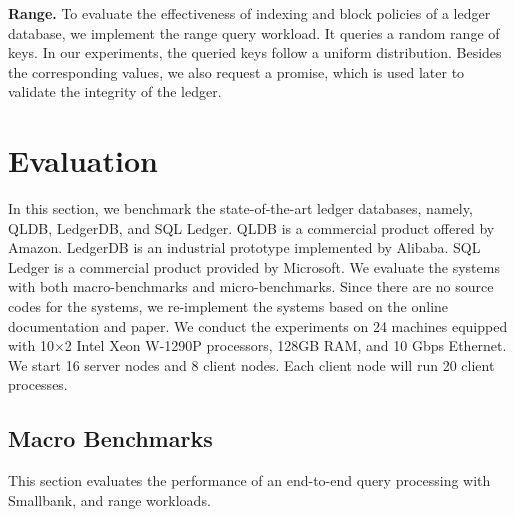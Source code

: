 \documentclass[11pt,dvipdfm]{article}
\begin{document}
\textbf{Range.}
To evaluate the effectiveness of indexing and block policies of a ledger database, we implement the range query workload. It queries a random range of keys. In our experiments, the queried keys follow a uniform distribution.  Besides the corresponding values, we also request a promise, which is used later to validate the integrity of the ledger.


\section{Evaluation}
\label{sec:exp}

In this section, we benchmark the state-of-the-art ledger databases, namely, QLDB, LedgerDB, and SQL Ledger. QLDB is a commercial product offered by Amazon. LedgerDB is an industrial prototype implemented by Alibaba. SQL Ledger is a commercial product provided by Microsoft.
We evaluate the systems with both macro-benchmarks and micro-benchmarks. Since there are no source codes for the systems, we re-implement the systems based on the online documentation and paper. We conduct the experiments on 24 machines equipped with 10$\times$2 Intel Xeon W-1290P processors, 128GB RAM, and 10 Gbps Ethernet. We start 16 server nodes and 8 client nodes. Each client node will run 20 client processes.

\subsection{Macro Benchmarks}

This section evaluates the performance of an end-to-end query processing with Smallbank, and range workloads.
\end{document}

